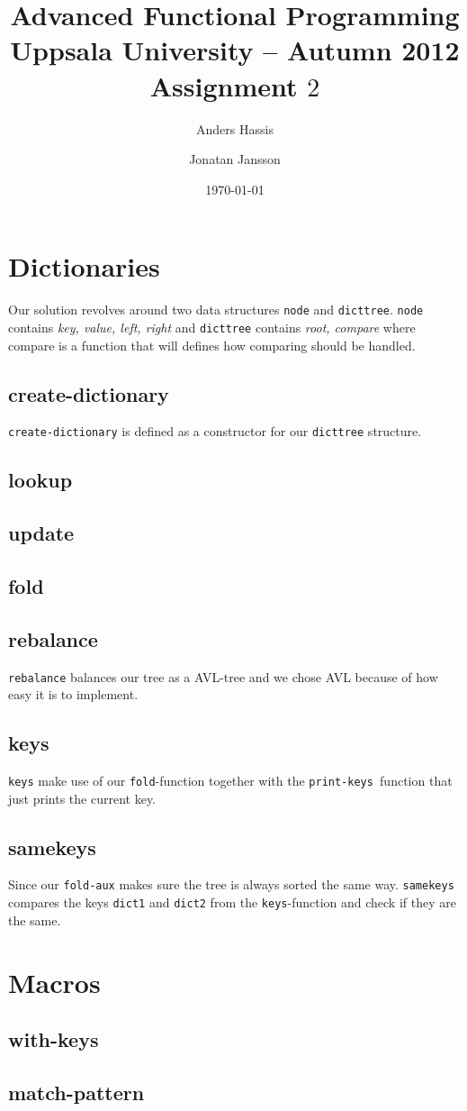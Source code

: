 \documentclass[a4paper,11pt]{article}
\title{\textbf{Advanced Functional Programming \\
    Uppsala University -- Autumn 2012 \\
    Assignment $2$ %
  }
}
\author{Anders Hassis \and Jonatan Jansson}
\date{\today}
\begin{document}
\maketitle

\section{Dictionaries}

Our solution revolves around two data structures \texttt{node} and \texttt{dicttree}. \texttt{node} contains \emph{key, value, left, right} and \texttt{dicttree} contains \emph{root, compare} where compare is a function that will defines how comparing should be handled.

\subsection{create-dictionary}
\texttt{create-dictionary} is defined as a constructor for our \texttt{dicttree} structure.

\subsection{lookup}


\subsection{update}

\subsection{fold}

\subsection{rebalance}
\texttt{rebalance} balances our tree as a AVL-tree and we chose AVL because of how easy it is to implement.

\subsection{keys}
\texttt{keys} make use of our \texttt{fold}-function together with the \texttt{print-keys }function  that just prints the current key.

\subsection{samekeys}
Since our \texttt{fold-aux} makes sure the tree is always sorted the same way. \texttt{samekeys} compares the keys \texttt{dict1} and \texttt{dict2} from the \texttt{keys}-function and check if they are the same.

\section{Macros}

\subsection{with-keys}
\subsection{match-pattern}
\end{document}
